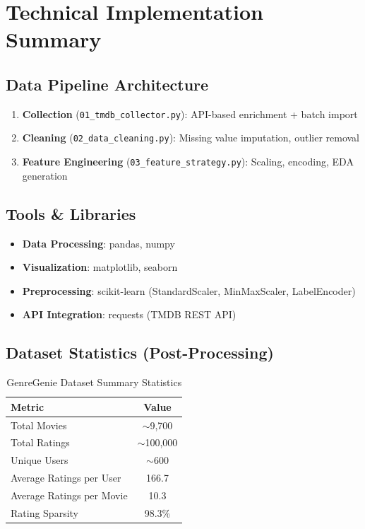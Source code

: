 \documentclass[11pt,a4paper]{article}
\begin{document}
\section{Technical Implementation Summary}

\subsection{Data Pipeline Architecture}
\begin{enumerate}
    \item \textbf{Collection} (\texttt{01\_tmdb\_collector.py}): API-based enrichment + batch import
    \item \textbf{Cleaning} (\texttt{02\_data\_cleaning.py}): Missing value imputation, outlier removal
    \item \textbf{Feature Engineering} (\texttt{03\_feature\_strategy.py}): Scaling, encoding, EDA generation
\end{enumerate}

\subsection{Tools \& Libraries}
\begin{itemize}
    \item \textbf{Data Processing}: pandas, numpy
    \item \textbf{Visualization}: matplotlib, seaborn
    \item \textbf{Preprocessing}: scikit-learn (StandardScaler, MinMaxScaler, LabelEncoder)
    \item \textbf{API Integration}: requests (TMDB REST API)
\end{itemize}

\subsection{Dataset Statistics (Post-Processing)}
\begin{table}[H]
\centering
{}
\begin{tabular}{@{}lc@{}}
\toprule
\textbf{Metric} & \textbf{Value} \\ \midrule
Total Movies & $\sim$9,700 \\
Total Ratings & $\sim$100,000 \\
Unique Users & $\sim$600 \\
Average Ratings per User & 166.7 \\
Average Ratings per Movie & 10.3 \\
Rating Sparsity & 98.3\% \\
\bottomrule
\end{tabular}
\caption{GenreGenie Dataset Summary Statistics}
\label{tab:dataset_stats}
\end{table}
\end{document}
